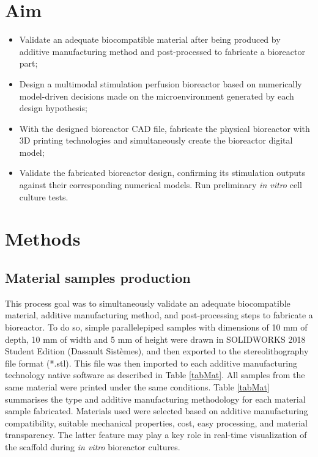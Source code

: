 \section{Aim}
\begin{itemize}
\item Validate an adequate biocompatible material after being produced by additive manufacturing method and post-processed to fabricate a bioreactor part; 
\item Design a multimodal stimulation perfusion bioreactor based on numerically model-driven decisions made on the microenvironment generated by each design hypothesis;
\item With the designed bioreactor \acs{CAD} file, fabricate the physical bioreactor with \acs{3D} printing technologies and simultaneously create the bioreactor digital model;
\item Validate the fabricated bioreactor design, confirming its stimulation outputs against their corresponding numerical models. Run preliminary \textit{in vitro} cell culture tests.
\end{itemize}




\section{Methods}


\subsection{Material samples production}
This process goal was to simultaneously validate an adequate biocompatible material, additive manufacturing method, and post-processing steps to fabricate a bioreactor. To do so, simple parallelepiped samples with dimensions of 10 \si{\milli\meter} of depth, 10 \si{\milli\meter} of width and 5 \si{\milli\meter} of height were drawn in SOLIDWORKS 2018 Student Edition (Dassault Sistèmes), and then exported to the stereolithography file format (*.stl). This file was then imported to each additive manufacturing technology native software as described in Table \ref{tabMat}. All samples from the same material were printed under the same conditions. Table \ref{tabMat} summarises the type and additive manufacturing methodology for each material sample fabricated. Materials used were selected based on additive manufacturing compatibility, suitable mechanical properties, cost, easy processing, and material transparency. The latter feature may play a key role in real-time visualization of the scaffold during \textit{in vitro} bioreactor cultures.   
 

